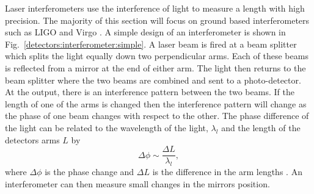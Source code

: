 Laser interferometers use the interference of light to measure a length with high precision.
The majority of this section will focus on ground based interferometers such as \gls{LIGO} and Virgo \citep{aasi2015AdvancedLIGO,acernese2015AdvancedVirgo}.
A simple design of an interferometer is shown in Fig.~\ref{detectors:interferometer:simple}. 
A laser beam is fired at a beam splitter which splits the light equally down two perpendicular arms. 
Each of these beams is reflected from a mirror at the end of either arm.
The light then returns to the beam splitter where the two beams are combined and sent to a photo-detector.
At the output, there is an interference pattern between the two beams.
If the length of one of the arms is changed then the interference pattern will change as the phase of one beam changes with respect to the other.
The phase difference of the light can be related to the wavelength of the light, $\lambda_l$ and the length of the detectors arms $L$ by
\begin{equation}
\label{intro:detectors:phasechange}
\Delta \phi \sim \frac{\Delta L}{\lambda_l},
\end{equation}
where $\Delta \phi$ is the phase change and $\Delta L$ is the difference in the arm lengths \citep{brown2017ComparisonSelfselected}.
An interferometer can then measure small changes in the mirrors position.
